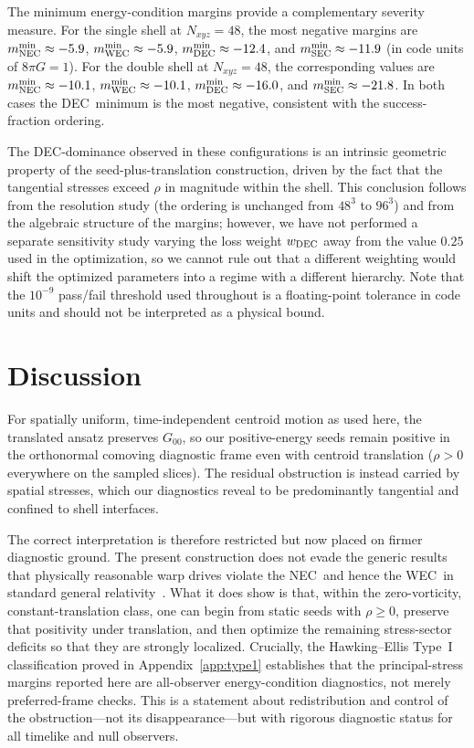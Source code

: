 \documentclass[11pt]{article}
\makeatletter
\newcommand{\@abbr}[1]{\ifmmode\mathrm{#1}\else\textsc{#1}\fi}
\newcommand{\WEC}{\@abbr{WEC}}
\newcommand{\NEC}{\@abbr{NEC}}
\newcommand{\SEC}{\@abbr{SEC}}
\newcommand{\DEC}{\@abbr{DEC}}
\makeatother
\begin{document}
The minimum energy-condition margins provide a complementary severity measure. For the single shell at $N_{xyz}=48$, the most negative margins are $m_\NEC^{\min}\approx -5.9$, $m_\WEC^{\min}\approx -5.9$, $m_\DEC^{\min}\approx -12.4$, and $m_\SEC^{\min}\approx -11.9$ (in code units of $8\pi G=1$). For the double shell at $N_{xyz}=48$, the corresponding values are $m_\NEC^{\min}\approx -10.1$, $m_\WEC^{\min}\approx -10.1$, $m_\DEC^{\min}\approx -16.0$, and $m_\SEC^{\min}\approx -21.8$. In both cases the \DEC\ minimum is the most negative, consistent with the success-fraction ordering.

The \DEC-dominance observed in these configurations is an intrinsic geometric property of the seed-plus-translation construction, driven by the fact that the tangential stresses exceed $\rho$ in magnitude within the shell. This conclusion follows from the resolution study (the ordering is unchanged from $48^3$ to $96^3$) and from the algebraic structure of the margins; however, we have not performed a separate sensitivity study varying the loss weight $w_\DEC$ away from the value $0.25$ used in the optimization, so we cannot rule out that a different weighting would shift the optimized parameters into a regime with a different hierarchy. Note that the $10^{-9}$ pass/fail threshold used throughout is a floating-point tolerance in code units and should not be interpreted as a physical bound.

\section{Discussion}
\label{sec:implications}
For spatially uniform, time-independent centroid motion as used here, the translated ansatz preserves $G_{00}$, so our positive-energy seeds remain positive in the orthonormal comoving diagnostic frame even with centroid translation ($\rho > 0$ everywhere on the sampled slices). The residual obstruction is instead carried by spatial stresses, which our diagnostics reveal to be predominantly tangential and confined to shell interfaces.

The correct interpretation is therefore restricted but now placed on firmer diagnostic ground. The present construction does not evade the generic results that physically reasonable warp drives violate the \NEC\ and hence the \WEC\ in standard general relativity~\cite{Olum:1998mu,Santiago:2021aup}. What it does show is that, within the zero-vorticity, constant-translation class, one can begin from static seeds with $\rho\ge 0$, preserve that positivity under translation, and then optimize the remaining stress-sector deficits so that they are strongly localized. Crucially, the Hawking--Ellis Type~I classification proved in Appendix~\ref{app:type1} establishes that the principal-stress margins reported here are all-observer energy-condition diagnostics, not merely preferred-frame checks. This is a statement about redistribution and control of the obstruction---not its disappearance---but with rigorous diagnostic status for all timelike and null observers.
\end{document}
